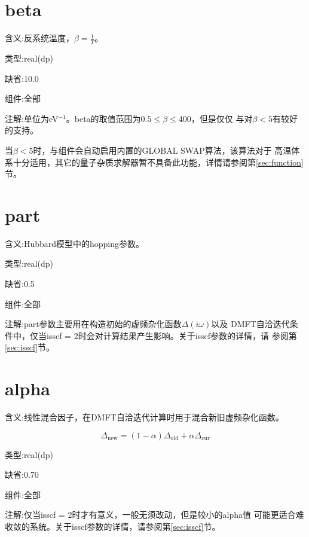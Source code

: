 \section{beta  }
\label{sec:beta}

{\color{red}含义}:反系统温度，$\beta = \frac{1}{T}$。

{\color{green}类型}:real(dp)

{\color{blue}缺省}:10.0

{\color{brown}组件}:全部

{\color{purple}注解}:单位为eV$^{-1}$。beta的取值范围为$0.5 \leq \beta \leq 400$，但是仅仅 
{\azalea}与{\gardenia}对$\beta < 5$有较好的支持。

当$\beta < 5$时，{\azalea}与{\gardenia}组件会自动启用内置的GLOBAL SWAP算法，该算法对于
高温体系十分适用，其它的量子杂质求解器暂不具备此功能，详情请参阅第\ref{sec:function}节。

\section{part  }
\label{sec:part}

{\color{red}含义}:Hubbard模型中的hopping参数。

{\color{green}类型}:real(dp)

{\color{blue}缺省}:0.5

{\color{brown}组件}:全部

{\color{purple}注解}:part参数主要用在构造初始的虚频杂化函数$\Delta(i\omega)$以及
DMFT自洽迭代条件中，仅当isscf = 2时会对计算结果产生影响。关于isscf参数的详情，请
参阅第\ref{sec:isscf}节。

\section{alpha }
\label{sec:alpha}

{\color{red}含义}:线性混合因子，在DMFT自洽迭代计算时用于混合新旧虚频杂化函数。

\begin{equation}
\Delta_{\text{new}} = (1 - \alpha) \Delta_{\text{old}} + \alpha \Delta_{\text{cur}}
\end{equation}

{\color{green}类型}:real(dp)

{\color{blue}缺省}:0.70

{\color{brown}组件}:全部

{\color{purple}注解}:仅当isscf = 2时才有意义，一般无须改动，但是较小的alpha值
可能更适合难收敛的系统。关于isscf参数的详情，请参阅第\ref{sec:isscf}节。

